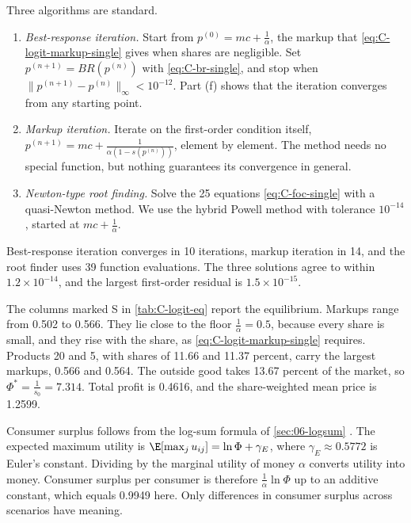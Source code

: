 Three algorithms are standard.
\begin{enumerate}
  \item \emph{Best-response iteration.} Start from $p^{(0)} = mc + \frac{1}{\alpha}$, the markup that
  \eqref{eq:C-logit-markup-single} gives when shares are negligible. Set $p^{(n+1)} = BR(p^{(n)})$ with
  \eqref{eq:C-br-single}, and stop when $\|p^{(n+1)} - p^{(n)}\|_\infty < 10^{-12}$. Part (f) shows that the
  iteration converges from any starting point.
  \item \emph{Markup iteration.} Iterate on the first-order condition itself,
  $p^{(n+1)} = mc + \frac{1}{\alpha(1 - s(p^{(n)}))}$, element by element. The method needs no special function,
  but nothing guarantees its convergence in general.
  \item \emph{Newton-type root finding.} Solve the 25 equations \eqref{eq:C-foc-single} with a quasi-Newton
  method. We use the hybrid Powell method with tolerance $10^{-14}$, started at $mc + \frac{1}{\alpha}$.
\end{enumerate}
Best-response iteration converges in 10 iterations, markup iteration in 14, and the root finder uses 39 function
evaluations. The three solutions agree to within $1.2\times10^{-14}$, and the largest first-order residual is
$1.5\times10^{-15}$.

The columns marked S in \cref{tab:C-logit-eq} report the equilibrium. Markups range from 0.502 to 0.566. They lie
close to the floor $\frac{1}{\alpha} = 0.5$, because every share is small, and they rise with the share, as
\eqref{eq:C-logit-markup-single} requires. Products 20 and 5, with shares of 11.66 and 11.37 percent, carry the
largest markups, 0.566 and 0.564. The outside good takes 13.67 percent of the market, so $\Phi^* = \frac{1}{s_0} = 7.314$.
Total profit is 0.4616, and the share-weighted mean price is 1.2599.

Consumer surplus follows from the log-sum formula of \cref{sec:06-logsum} \citep{SmallRosen1981}. The expected
maximum utility is $\E[\max_{j}u_{ij}] = \ln\Phi + \gamma_E$, where $\gamma_E \approx 0.5772$ is Euler's constant.
Dividing by the marginal utility of money $\alpha$ converts utility into money. Consumer surplus per consumer is
therefore $\frac{1}{\alpha}\ln\Phi$ up to an additive constant, which equals 0.9949 here. Only differences in
consumer surplus across scenarios have meaning.

